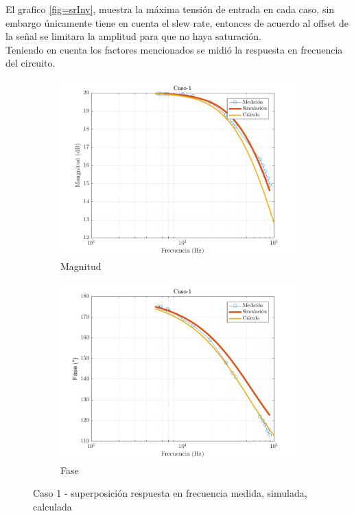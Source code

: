 \documentclass[../../main.tex]{subfiles}
\begin{document}
El grafico \ref{fig=srInv}, muestra la máxima tensión de entrada en cada caso, sin embargo únicamente tiene en cuenta el slew rate, entonces de acuerdo al offset de la señal se limitara la amplitud para que no haya saturación.
\\
Teniendo en cuenta los factores mencionados se midió la respuesta en frecuencia del circuito.

\begin{figure}[H]
\centering
\begin{subfigure}[http]{0.49\textwidth}
\includegraphics[width=\textwidth]{Caso-1_mag_inv}
\caption{Magnitud}\label{fig=magInvC1}
\end{subfigure}
\begin{subfigure}[http]{0.49\textwidth}
\includegraphics[width=\textwidth]{Caso-1_fase_inv}
\caption{Fase}
\end{subfigure}
\caption{Caso 1 - superposición respuesta en  frecuencia medida, simulada, calculada}
\end{figure}
\end{document}
